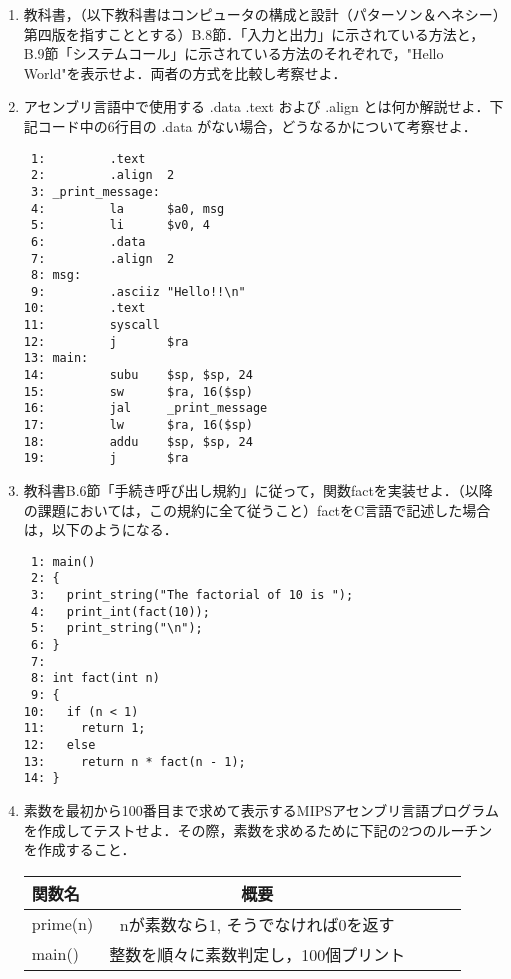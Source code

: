 \documentclass[a4j]{jarticle}
\begin{document}
\begin{enumerate}

\item 教科書，（以下教科書はコンピュータの構成と設計（パターソン＆ヘネシー）第四版を指すこととする）B.8節．「入力と出力」に示されている方法と，B.9節「システムコール」に示されている方法のそれぞれで，"Hello World"を表示せよ．両者の方式を比較し考察せよ．


\item アセンブリ言語中で使用する .data  .text および .align とは何か解説せよ．下記コード中の6行目の .data がない場合，どうなるかについて考察せよ．

{\baselineskip 3mm
\begin{verbatim}
 1:         .text
 2:         .align  2
 3: _print_message:
 4:         la      $a0, msg
 5:         li      $v0, 4
 6:         .data
 7:         .align  2
 8: msg:
 9:         .asciiz "Hello!!\n"
10:         .text
11:         syscall
12:         j       $ra
13: main:
14:         subu    $sp, $sp, 24
15:         sw      $ra, 16($sp)
16:         jal     _print_message
17:         lw      $ra, 16($sp)
18:         addu    $sp, $sp, 24
19:         j       $ra
\end{verbatim}
}

\item 教科書B.6節「手続き呼び出し規約」に従って，関数factを実装せよ．（以降の課題においては，この規約に全て従うこと）factをC言語で記述した場合は，以下のようになる．

{\baselineskip 3mm
\begin{verbatim}
 1: main()
 2: {
 3:   print_string("The factorial of 10 is ");
 4:   print_int(fact(10));
 5:   print_string("\n");
 6: }
 7: 
 8: int fact(int n)
 9: {
10:   if (n < 1)
11:     return 1;
12:   else
13:     return n * fact(n - 1);
14: }
\end{verbatim}
}

\item 素数を最初から100番目まで求めて表示するMIPSアセンブリ言語プログラムを作成してテストせよ．その際，素数を求めるために下記の2つのルーチンを作成すること．

\begin{center}
\begin{tabular}{lclcl}\hline
\centering
関数名&概要\\ \hline
prime(n)&nが素数なら1, そうでなければ0を返す\\ \hline
main()&整数を順々に素数判定し，100個プリント\\ \hline
\end{tabular}
\end{center}


\end{enumerate}
\end{document}
